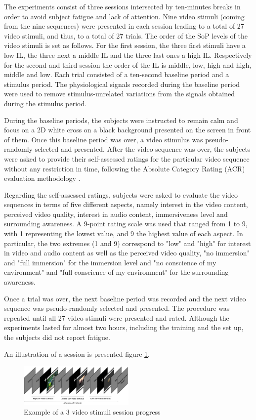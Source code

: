 The experiments consist of three sessions intersected by ten-minutes breaks in order to avoid subject fatigue and lack of attention. Nine video stimuli (coming from the nine sequences) were presented in each session leading to a total of 27 video stimuli, and thus, to a total of 27 trials. 
The order of the \ac{SoP} levels of the video stimuli is set as follows. For the first session, the three first stimuli have a low \ac{IL}, the three next a middle \ac{IL} and the three last ones a high \ac{IL}. Respectively for the second and third session the order of the \ac{IL} is middle, low, high and high, middle and low.
Each trial consisted of a ten-second baseline period and a stimulus period. The physiological signals recorded during the baseline period were used to remove stimulus-unrelated variations from the signals obtained during the stimulus period.


During the baseline periods, the subjects were instructed to remain calm and focus on a 2D white cross on a black background presented on the screen in front of them. Once this baseline period was over, a video stimulus was pseudo-randomly selected and presented.
After the video sequence was over, the subjects were asked to provide their self-assessed ratings for the particular video sequence without any restriction in time, following the Absolute Category Rating (ACR) evaluation methodology \cite{ACRevaluation}.

Regarding the self-assessed ratings, subjects were asked to evaluate the video sequences in terms of five different aspects, namely interest in the video content, perceived video quality, interest in audio content, immersiveness level and surrounding awareness. A 9-point rating scale was used that ranged from 1 to 9, with 1 representing the lowest value, and 9 the highest value of each aspect. In particular, the two extremes (1 and 9) correspond to "low" and "high" for interest in video and audio content as well as the perceived video quality, "no immersion" and "full immersion" for the immersion level and "no conscience of my environment" and "full conscience of my environment" for the surrounding awareness.

Once a trial was over, the next baseline period was recorded and the next video sequence was pseudo-randomly selected and presented. The procedure was repeated until all 27 video stimuli were presented and rated. Although the experiments lasted for almost two hours, including the training and the set up, the subjects did not report fatigue.

An illustration of a session is presented figure \ref{session}.

\begin{figure}[!ht]
    \center
    \includegraphics[width=0.5\textwidth]{./images/ExSession_.png}
    \caption{Example of a 3 video stimuli session progress }
    \label{session}
\end{figure}









